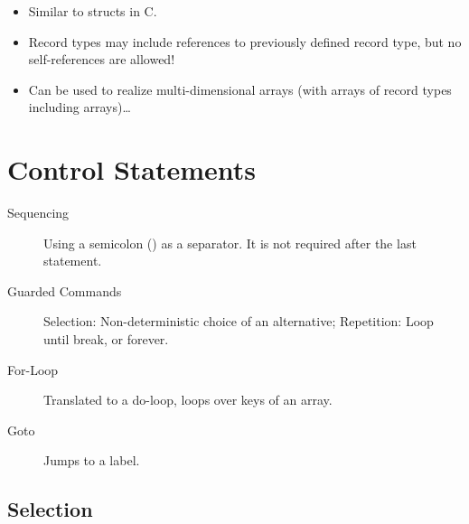		\begin{itemize}
			\item Similar to structs in C.
			\item Record types may include references to previously defined record type, but no self-references are allowed!
			\item Can be used to realize multi-dimensional arrays (with arrays of record types including arrays)\dots
		\end{itemize}

\section{Control Statements}
	\begin{description}
		\item[Sequencing] Using a semicolon (\inlinePromela{;}) as a separator. It is not required after the last statement.
		\item[Guarded Commands] Selection: Non-deterministic choice of an alternative; Repetition: Loop until break, or forever.
		\item[For-Loop] Translated to a do-loop, loops over keys of an array.
		\item[Goto] Jumps to a label.
	\end{description}

	\subsection{Selection}
		

